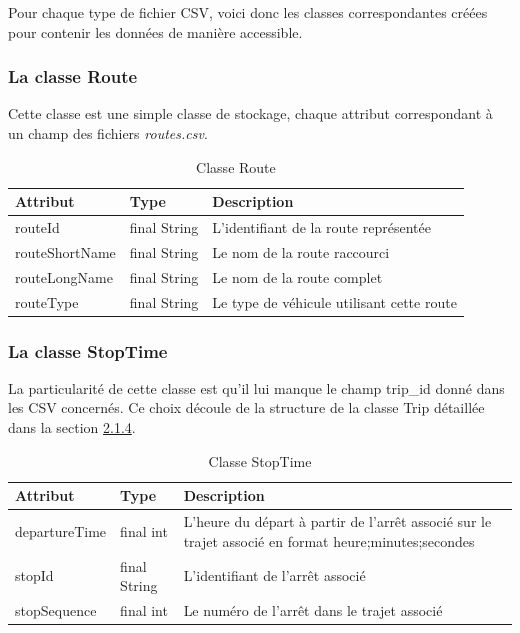 \documentclass[12pt]{article}
\begin{document}
Pour chaque type de fichier CSV, voici donc les classes correspondantes créées pour contenir les données de manière accessible.

\subsubsection{La classe Route}
Cette classe est une simple classe de stockage, chaque attribut correspondant à un champ des fichiers \emph{routes.csv}.

\begin{table}[h]
    \centering
    \begin{tabular}{|l|l|p{8cm}|}
    \hline
    \textbf{Attribut} & \textbf{Type} & \textbf{Description} \\
    \hline
    routeId & final String & L'identifiant de la route représentée \\
    routeShortName & final String & Le nom de la route raccourci \\
    routeLongName & final String & Le nom de la route complet \\
    routeType & final String & Le type de véhicule utilisant cette route \\
    \hline
    \end{tabular}
    \caption{Classe Route}
\end{table}

\subsubsection{La classe StopTime}
La particularité de cette classe est qu'il lui manque le champ trip\_id donné dans les CSV concernés. Ce choix découle
de la structure de la classe Trip détaillée dans la section \hyperref[sec:trip]{2.1.4}.
\begin{table}[h]
    \centering
    \begin{tabular}{|l|l|p{8cm}|}
    \hline
    \textbf{Attribut} & \textbf{Type} & \textbf{Description} \\
    \hline
    departureTime & final int & L'heure du départ à partir de
                                   l'arrêt associé sur le trajet associé en format 
                                   heure;minutes;secondes \\
    stopId & final String & L'identifiant de l'arrêt associé \\
    stopSequence & final int & Le numéro de l'arrêt dans le trajet associé \\
    \hline
    \end{tabular}
    \caption{Classe StopTime}
\end{table}
\end{document}
